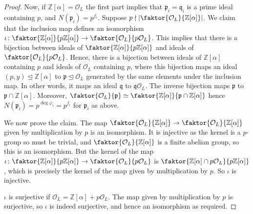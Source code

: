 \begin{proof}
    Now, if \( \mathbb Z[\alpha] = \mathcal O_L \) the first part implies that \( \mathfrak p_i = \mathfrak q_i \) is a prime ideal containing \( p \), and \( N(\mathfrak p_i) = p^{f_i} \).
    Suppose \( p \nmid \abs{\faktor{\mathcal O_L}{\mathbb Z[\alpha]}} \).
    We claim that the inclusion map defines an isomorphism \( \iota \colon \faktor{\mathbb Z[\alpha]}{p\mathbb Z[\alpha]} \to \faktor{\mathcal O_L}{p\mathcal O_L} \).
    This implies that there is a bijection between ideals of \( \faktor{\mathbb Z[\alpha]}{p\mathbb Z[\alpha]} \) and ideals of \( \faktor{\mathcal O_L}{p\mathcal O_L} \).
    Hence, there is a bijection between ideals of \( \mathbb Z[\alpha] \) containing \( p \) and ideals of \( \mathcal O_L \) containing \( p \), where this bijection maps an ideal \( (p, y) \trianglelefteq \mathbb Z[\alpha] \) to \( \mathfrak p \trianglelefteq \mathcal O_L \) generated by the same elements under the inclusion map.
    In other words, it maps an ideal \( \mathfrak q \) to \( \mathfrak q \mathcal O_L \).
    The inverse bijection maps \( \mathfrak p \) to \( \mathfrak p \cap \mathbb Z[\alpha] \).
    Moreover, \( \faktor{\mathcal O_L}{\mathfrak p} \simeq \faktor{\mathbb Z[\alpha]}{\mathfrak p \cap \mathbb Z[\alpha]} \) hence \( N(\mathfrak p_i) = p^{\deg \overline\varphi_i} = p^{f_i} \) for \( \mathfrak p_i \) as above.

    We now prove the claim.
    The map \( \faktor{\mathcal O_L}{\mathbb Z[\alpha]} \to \faktor{\mathcal O_L}{\mathbb Z[\alpha]} \) given by multiplication by \( p \) is an isomorphism.
    It is injective as the kernel is a \( p \)-group so must be trivial, and \( \faktor{\mathcal O_L}{\mathbb Z[\alpha]} \) is a finite abelian group, so this is an isomorphism.
    But the kernel of the map \( \iota \colon \faktor{\mathbb Z[\alpha]}{p\mathbb Z[\alpha]} \to \faktor{\mathcal O_L}{p\mathcal O_L} \) is \( \faktor{\mathbb Z[\alpha] \cap p \mathcal O_L}{p\mathbb Z[\alpha]} \), which is precisely the kernel of the map given by multiplication by \( p \).
    So \( \iota \) is injective.

    \( \iota \) is surjective if \( \mathcal O_L = \mathbb Z[\alpha] + p\mathcal O_L \).
    The map given by multiplication by \( p \) is surjective, so \( \iota \) is indeed surjective, and hence an isomorphism as required.


\end{proof}
